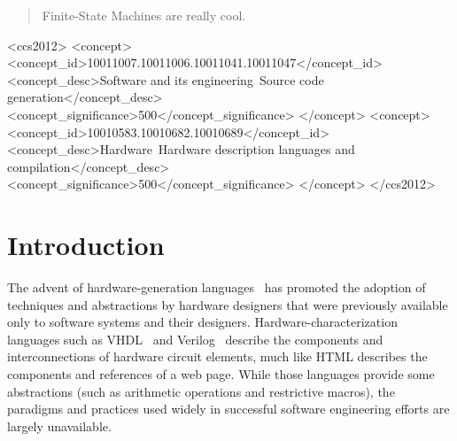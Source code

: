\documentclass[sigplan,anonymous,review]{acmart}
\begin{document}
\begin{abstract}
  Finite-State Machines are really cool.
\end{abstract}

\begin{CCSXML}
<ccs2012>
<concept>
<concept_id>10011007.10011006.10011041.10011047</concept_id>
<concept_desc>Software and its engineering~Source code generation</concept_desc>
<concept_significance>500</concept_significance>
</concept>
<concept>
<concept_id>10010583.10010682.10010689</concept_id>
<concept_desc>Hardware~Hardware description languages and compilation</concept_desc>
<concept_significance>500</concept_significance>
</concept>
</ccs2012>
\end{CCSXML}



\maketitle

\section{Introduction}

The advent of hardware-generation languages~\cite{hwgen} has promoted the adoption of techniques and abstractions by hardware designers that were previously available only to software systems and their designers.   Hardware-characterization languages such as VHDL~\cite{vhdl} and Verilog~\cite{verilog} describe the components and interconnections of hardware circuit elements, much like HTML describes the components and references of a web page.  While those languages provide some abstractions (such as arithmetic operations and restrictive macros), the paradigms and practices used widely in successful software engineering efforts are largely unavailable.
\end{document}
